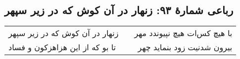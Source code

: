 \begin{center}
\section*{رباعی شمارهٔ ۹۳: زنهار در آن کوش که در زیر سپهر}
\label{sec:093}
\begin{longtable}{l p{0.5cm} r}
زنهار در آن کوش که در زیر سپهر
&&
با هیچ کس‌ات هیچ نپیوندد مهر
\\
تا بو که از این  هزاهزکون و فساد
&&
بیرون شدنیت زود بنماید چهر
\\
\end{longtable}
\end{center}
